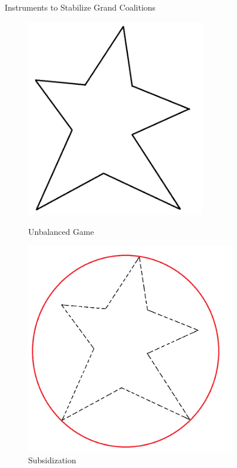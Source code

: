 \documentclass[14pt]{beamer}
\begin{document}
\begin{frame}{Instruments to Stabilize Grand Coalitions}
\begin{figure}[H]
\centering
\begin{minipage}[t]{0.32\textwidth}
\centering
\includegraphics[width=0.7\textwidth]{conculsion1.png}
\caption*{Unbalanced Game}
\end{minipage}
\begin{minipage}[t]{0.32\textwidth}
\centering
\includegraphics[width=0.82\textwidth]{conculsion3.png}
\caption*{Subsidization}

\end{minipage}
\end{figure}
\end{frame}
\end{document}
